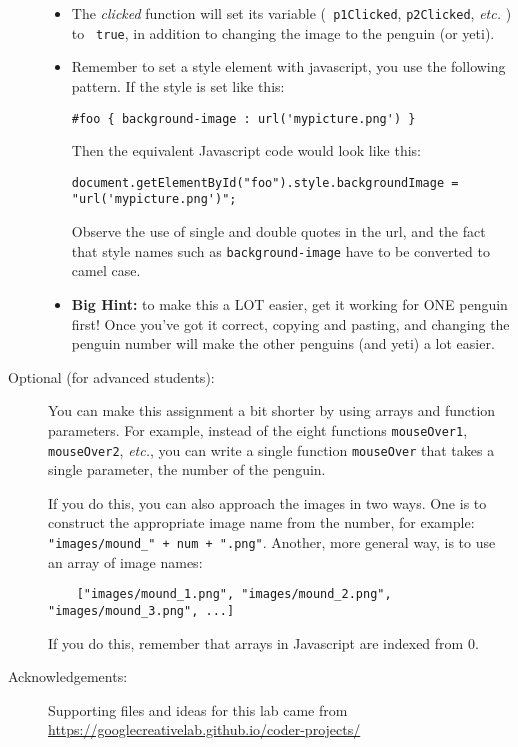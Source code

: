 \documentclass{article}
\begin{document}
\begin{description}
\begin{itemize}
  \item The {\em clicked} function will set its variable
    ({\tt
      p1Clicked}, {\tt p2Clicked}, {\em etc.} )
    to {\tt
      true}, in addition to changing the image to the penguin (or
      yeti). 

\item Remember to set a style element with javascript, you use the
  following pattern.  If the style is set like this:
  \begin{Verbatim}[frame=single]
#foo { background-image : url('mypicture.png') }
  \end{Verbatim}
  Then the equivalent Javascript code would look like this:
  \begin{Verbatim}[frame=single]
document.getElementById("foo").style.backgroundImage = "url('mypicture.png')";
  \end{Verbatim}
  Observe the use of single and double quotes in the url, and the fact
  that style names such as {\tt background-image} have to be converted to
  camel case.
    
  \item {\bf Big Hint:} to make this a LOT easier, get it working for ONE
    penguin first!  Once you've got it correct, copying and
    pasting, and changing the penguin number will make the other
    penguins (and yeti) a lot easier.
  \end{itemize}
  
\item[Optional (for advanced students):]
  You can make this assignment a bit shorter by using
  arrays and function parameters.  For example, instead of the eight
  functions {\tt mouseOver1}, {\tt mouseOver2}, {\em etc.}, you can
  write a single function {\tt mouseOver} that takes a single
  parameter, the number of the penguin.

  If you do this, you can also approach the images in two ways.  One
  is to construct the appropriate image name from the number, for
  example: \verb|"images/mound_" + num + ".png"|.  Another, more
  general way, is to use an array of image names:
  \begin{Verbatim}
    ["images/mound_1.png", "images/mound_2.png", "images/mound_3.png", ...]
  \end{Verbatim}
  If you do this, remember that arrays in Javascript are indexed from
  0. 
\item[Acknowledgements:] Supporting files and ideas for this lab came
  from\\ \url{https://googlecreativelab.github.io/coder-projects/}


\end{description}
\end{document}
